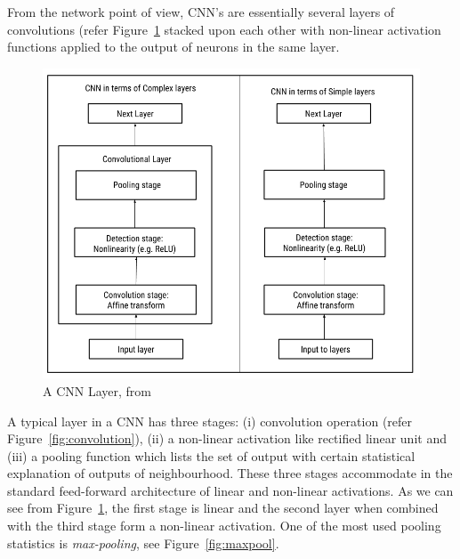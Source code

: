 From the network point of view, CNN's are essentially several layers of convolutions (refer Figure~\ref{fig:CNN_layer} stacked upon each other with non-linear activation functions applied to the output of neurons in the same layer. 
\begin{figure}[!htb]
    \centering
    \includegraphics[scale=0.5]{Figures/cnn.png}
    \caption{A CNN Layer, from~\cite{Goodfellow-et-al-2016}}
    \label{fig:CNN_layer}
\end{figure}
A typical layer in a CNN has three stages: (i) convolution operation (refer Figure~\ref{fig:convolution}), (ii) a non-linear activation like rectified linear unit and (iii) a pooling function which lists the set of output with certain statistical explanation of outputs of neighbourhood. These three stages accommodate in the standard feed-forward architecture of linear and non-linear activations. As we can see from Figure~\ref{fig:CNN_layer},
the first stage is linear and the second layer when combined with the third stage form a non-linear activation. 
One of the most used pooling statistics is \emph{max-pooling}, see Figure~\ref{fig:maxpool}. 



